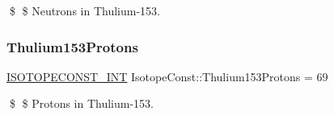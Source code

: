 \$ \$ Neutrons in Thulium-\/153. \mbox{\label{group___isotope_const-_thulium-_tm153_gac40c4ad695e11834d72933329403bcce}} 
\subsubsection{\texorpdfstring{Thulium153\+Protons}{Thulium153Protons}}
{\footnotesize\ttfamily \mbox{\hyperlink{group___isotope_const-_macros_ga5f18360b3e99483a35c32d789e62621c}{I\+S\+O\+T\+O\+P\+E\+C\+O\+N\+S\+T\+\_\+\+I\+NT}} Isotope\+Const\+::\+Thulium153\+Protons = 69}

\$ \$ Protons in Thulium-\/153. 